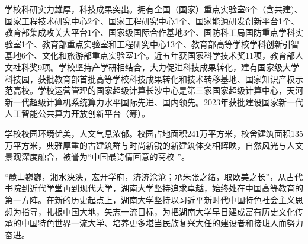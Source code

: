学校科研实力雄厚，科技成果突出。拥有全国（国家）重点实验室6个（含共建)、国家工程技术研究中心2个、国家工程研究中心1个、国家能源研发创新平台1个、教育部集成攻关大平台1个、国家级国际合作基地3个、国防科工局国防重点学科实验室1个、教育部重点实验室和工程研究中心13个、教育部高等学校学科创新引智基地6个、文化和旅游部重点实验室1个。近五年获国家科学技术奖11项，教育部人文社科奖9项。学校坚持产学研相结合，大力促进科技成果转化，建有国家级大学科技园，获批教育部首批高等学校科技成果转化和技术转移基地、国家知识产权示范高校。学校运营管理的国家超级计算长沙中心是第三家国家超级计算中心，天河新一代超级计算机系统算力水平国际先进、国内领先。2023年获批建设国家新一代人工智能公共算力开放创新平台（筹）。

学校校园环境优美，人文气息浓郁。校园占地面积241万平方米，校舍建筑面积135万平方米，典雅厚重的古建筑群与时尚新锐的新建筑体交相辉映，自然风光与人文景观深度融合，被誉为“中国最诗情画意的高校 ”。

“麓山巍巍，湘水泱泱，宏开学府，济济沧沧；承朱张之绪，取欧美之长”，从古代书院到近代学堂再到现代大学，湖南大学坚持追求卓越，始终处在中国高等教育的第一方阵。在新的历史起点上，湖南大学坚持以习近平新时代中国特色社会主义思想为指导，扎根中国大地，矢志一流目标，为把湖南大学早日建成富有历史文化传承的中国特色世界一流大学、培养更多堪当民族复兴大任的建设者和接班人而努力奋进。

